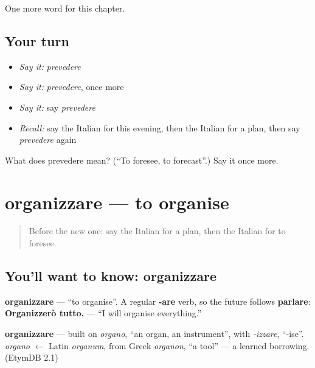 \begin{grammarlens}[title={What you've built}]
One more word for this chapter.
\end{grammarlens}

\subsection*{Your turn}
\begin{itemize}
\raggedright
  \item \emph{Say it:} \emph{prevedere}
  \item \emph{Say it:} \emph{prevedere}, once more
  \item \emph{Say it:} say \emph{prevedere}
  \item \emph{Recall:} say the Italian for this evening, then the Italian for a plan, then say \emph{prevedere} again
\end{itemize}

\begin{tcolorbox}[breakable,colback=teal!4,colframe=teal!35!black,title={Before you move on}]
What does prevedere mean? (\textquotedblleft{}To foresee, to forecast\textquotedblright{}.) Say it once more.
\end{tcolorbox}
\section[organizzare]{organizzare — to organise}

\label{lesson:IT-C138-organizzare}



\begin{quote}
Before the new one: say the Italian for a plan, then the Italian for to foresee.
\end{quote}

\subsection*{You'll want to know: organizzare}
\textbf{organizzare} — \textquotedblleft{}to organise\textquotedblright{}. A regular \textbf{-are} verb, so the future follows \textbf{parlare}: \textbf{Organizzerò tutto.} — \textquotedblleft{}I will organise everything.\textquotedblright{}

\begin{cousinweb}
\textbf{organizzare} — built on \emph{organo}, \textquotedblleft{}an organ, an instrument\textquotedblright{}, with \emph{-izzare}, \textquotedblleft{}-ise\textquotedblright{}. \emph{organo} $\leftarrow$ Latin \emph{organum}, from Greek \emph{organon}, \textquotedblleft{}a tool\textquotedblright{} — a learned borrowing. (EtymDB 2.1)
\end{cousinweb}

